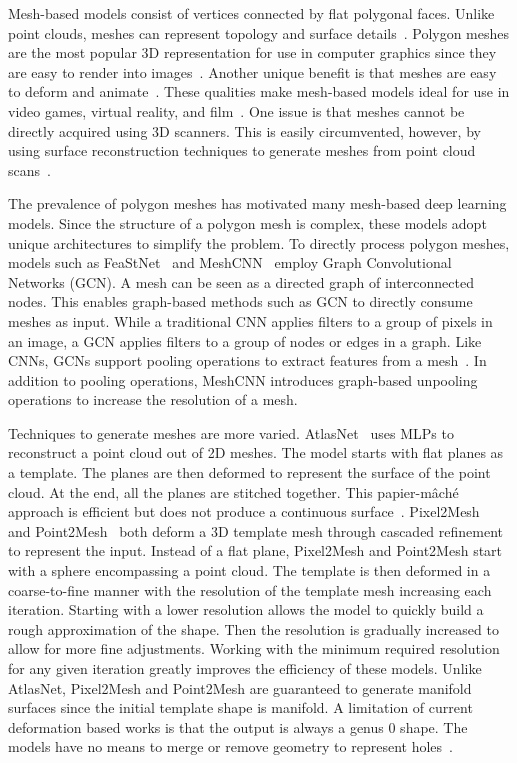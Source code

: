 Mesh-based models consist of vertices connected by flat polygonal faces. Unlike point clouds, meshes can represent topology and surface details~\cite{Xiao2020}. Polygon meshes are the most popular 3D representation for use in computer graphics since they are easy to render into images~\cite{Watt1996}. Another unique benefit is that meshes are easy to deform and animate~\cite{Wang2018}. These qualities make mesh-based models ideal for use in video games, virtual reality, and film~\cite{Nash2020}. One issue is that meshes cannot be directly acquired using 3D scanners. This is easily circumvented, however, by using surface reconstruction techniques to generate meshes from point cloud scans~\cite{Yuan2022}.

The prevalence of polygon meshes has motivated many mesh-based deep learning models. Since the structure of a polygon mesh is complex, these models adopt unique architectures to simplify the problem. To directly process polygon meshes, models such as FeaStNet~\cite{Verma2018} and MeshCNN~\cite{Hanocka2019} employ Graph Convolutional Networks (GCN). A mesh can be seen as a directed graph of interconnected nodes. This enables graph-based methods such as GCN to directly consume meshes as input. While a traditional CNN applies filters to a group of pixels in an image, a GCN applies filters to a group of nodes or edges in a graph. Like CNNs, GCNs support pooling operations to extract features from a mesh~\cite{Verma2018}. In addition to pooling operations, MeshCNN introduces graph-based unpooling operations to increase the resolution of a mesh.

Techniques to generate meshes are more varied. AtlasNet~\cite{Groueix2018} uses MLPs to reconstruct a point cloud out of 2D meshes. The model starts with flat planes  as a template. The planes are then deformed to represent the surface of the point cloud. At the end, all the planes are stitched together. This papier-m\^{a}ch\'{e} approach is efficient but does not produce a continuous surface~\cite{Groueix2018}. Pixel2Mesh~\cite{Wang2018} and Point2Mesh~\cite{Hanocka2020} both deform a 3D template mesh through cascaded refinement to represent the input. Instead of a flat plane, Pixel2Mesh and Point2Mesh start with a sphere encompassing a point cloud. The template is then deformed in a coarse-to-fine manner with the resolution of the template mesh increasing each iteration. Starting with a lower resolution allows the model to quickly build a rough approximation of the shape. Then the resolution is gradually increased to allow for more fine adjustments. Working with the minimum required resolution for any given iteration greatly improves the efficiency of these models. Unlike AtlasNet, Pixel2Mesh and Point2Mesh are guaranteed to generate manifold surfaces since the initial template shape is manifold. A limitation of current deformation based works is that the output is always a genus 0 shape. The models have no means to merge or remove geometry to represent holes~\cite{Wang2018, Hanocka2020}.

